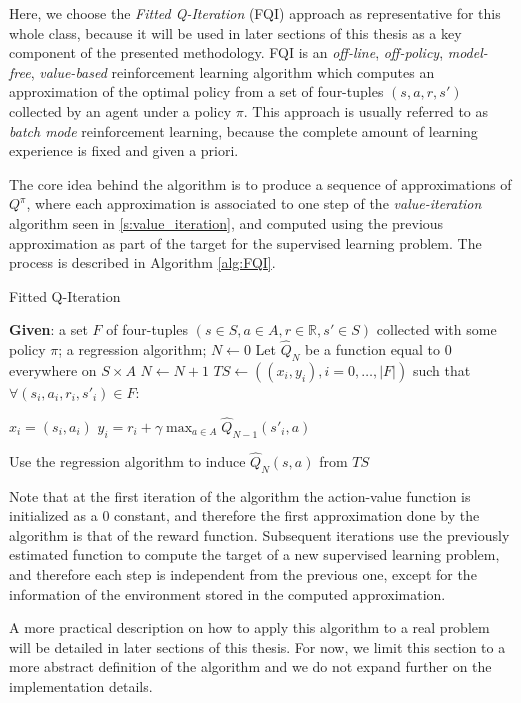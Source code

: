 Here, we choose the \textit{Fitted Q-Iteration} (FQI) approach as representative
for this whole class, because it will be used in later sections of this thesis 
as a key component of the presented methodology.
FQI is an \textit{off-line}, \textit{off-policy}, \textit{model-free}, 
\textit{value-based} reinforcement learning algorithm which computes an 
approximation of the optimal policy from a set of four-tuples $(s, a, r, s')$
collected by an agent under a policy $\pi$.
This approach is usually referred to as \textit{batch mode} reinforcement 
learning, because the complete amount of learning experience is fixed and given
a priori.

The core idea behind the algorithm is to produce a sequence of approximations of
$Q^\pi$, where each approximation is associated to one step of the 
\textit{value-iteration} algorithm seen in \ref{s:value_iteration}, and computed
using the previous approximation as part of the target for the supervised 
learning problem. The process is described in Algorithm \ref{alg:FQI}.
%
\begin{algorithm}[h]
    \caption{Fitted Q-Iteration}
    \label{alg:FQI}
    \begin{algorithmic}
        \STATE \textbf{Given}: a set $F$ of four-tuples $(s \in S, a \in A, r \in \mathbb{R}, s' \in S)$ collected with some policy $\pi$; a regression algorithm;
        \STATE $N \leftarrow 0$
        \STATE Let $\hat{Q}_N$ be a function equal to $0$ everywhere on $S \times A$
        \REPEAT
	    \STATE $N \leftarrow N+1$
	    \STATE $TS \leftarrow ((x_i, y_i), i = 0, \dots, |F|)$ such that $\forall (s_i, a_i, r_i, s'_i) \in F$:
		\begin{ALC@g}
		\STATE $x_i = (s_i, a_i)$
		\STATE $y_i = r_i + \gamma \max_{a \in A} \hat{Q}_{N-1} (s'_i, a)$
		\end{ALC@g}
	    \STATE Use the regression algorithm to induce $\hat{Q}_N(s, a)$ from $TS$
    \end{algorithmic}
\end{algorithm}
%

Note that at the first iteration of the algorithm the action-value function is
initialized as a $0$ constant, and therefore the first approximation done by the 
algorithm is that of the reward function.
Subsequent iterations use the previously estimated function to compute the 
target of a new supervised learning problem, and therefore each step is 
independent from the previous one, except for the information of the environment 
stored in the computed approximation. 

A more practical description on how to apply this algorithm to a real problem
will be detailed in later sections of this thesis. For now, we limit this 
section to a more abstract definition of the algorithm and we do not expand 
further on the implementation details. 


